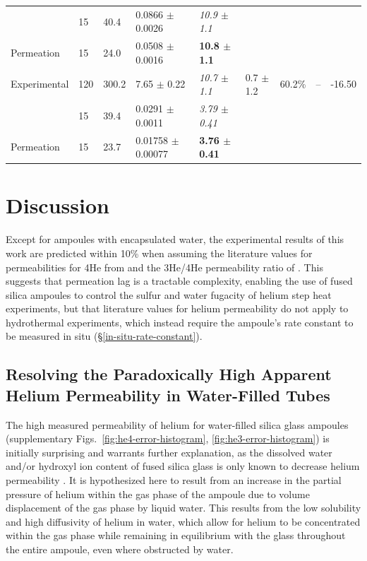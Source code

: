 \begin{chplandscape}
\begin{small}
\begin{longtable}{p{1.9cm}p{0.9cm}p{1.0cm}p{2.7cm}p{1.8cm}p{1.7cm}p{1.5cm}p{2.1cm}p{1.4cm}}
 & 15 & 40.4 & 0.0866 $\pm$ 0.0026 & \textit{10.9 $\pm$ 1.1} &  &  &  &  \\
Permeation & 15 & 24.0 & 0.0508 $\pm$ 0.0016 & \textbf{10.8 $\pm$ 1.1} &  &  &  &  \\
Experimental & 120 & 300.2 & 7.65 $\pm$ 0.22 & \textit{10.7 $\pm$ 1.1} & 0.7 $\pm$ 1.2 & 60.2\% & -- & -16.50 \\
 & 15 & 39.4 & 0.0291 $\pm$ 0.0011 & \textit{3.79 $\pm$ 0.41} &  &  &  &  \\
Permeation & 15 & 23.7 & 0.01758 $\pm$ 0.00077 & \textbf{3.76 $\pm$ 0.41} &  &  &  &  \\
\end{longtable}
\end{small}
\end{chplandscape}

\section{Discussion}\label{discussion}

Except for ampoules with encapsulated water, the experimental results of this work are predicted within 10\% when assuming the literature values for permeabilities for 4He from \citet{swets1961} and the 3He/4He permeability ratio of \citet{jones1953}. This suggests that permeation lag is a tractable complexity, enabling the use of fused silica ampoules to control the sulfur and water fugacity of helium step heat experiments, but that literature values for helium permeability do not apply to hydrothermal experiments, which instead require the ampoule's rate constant to be measured in situ (\S\ref{in-situ-rate-constant}).

\subsection{Resolving the Paradoxically High Apparent Helium Permeability in Water-Filled Tubes}\label{resolving-the-paradoxically-high-apparent-helium-permeability-in-water-filled-tubes}

The high measured permeability of helium for water-filled silica glass ampoules (supplementary Figs.~\ref{fig:he4-error-histogram}, \ref{fig:he3-error-histogram}) is initially surprising and warrants further explanation, as the dissolved water and/or hydroxyl ion content of fused silica glass is only known to decrease helium permeability \citep{tsuru2011,shelby1972,masaryk1968}. It is hypothesized here to result from an increase in the partial pressure of helium within the gas phase of the ampoule due to volume displacement of the gas phase by liquid water. This results from the low solubility and high diffusivity of helium in water, which allow for helium to be concentrated within the gas phase while remaining in equilibrium with the glass throughout the entire ampoule, even where obstructed by water.

